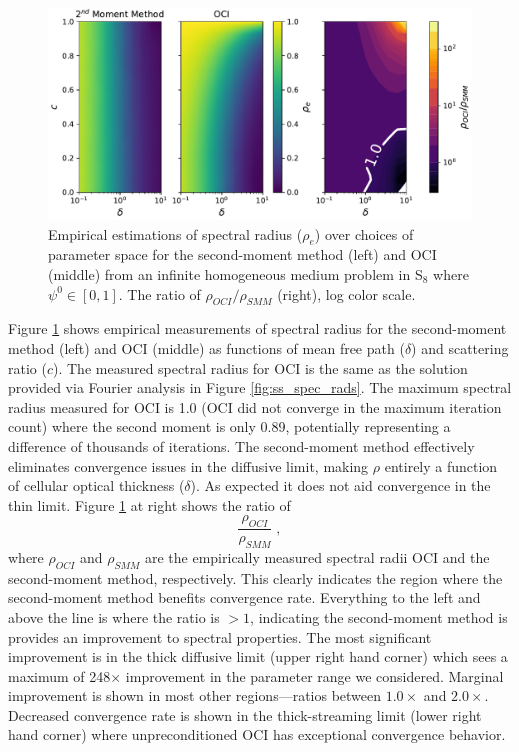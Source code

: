 \begin{figure}
    \centering
    \includegraphics[width=\linewidth]{figures/smm_paper/smm_acc.pdf}
    \caption{Empirical estimations of spectral radius ($\rho_e$) over choices of parameter space for the second-moment method (left) and OCI (middle) from an infinite homogeneous medium problem in S$_8$ where $\psi^{0} \in [0,1]$. The ratio of $\rho_{OCI} / \rho_{SMM}$ (right), log color scale.}
    \label{fig:spec_rad}
\end{figure}

Figure \ref{fig:spec_rad} shows empirical measurements of spectral radius for the second-moment method (left) and OCI (middle) as functions of mean free path ($\delta$) and scattering ratio ($c$).
The measured spectral radius for OCI is the same as the solution provided via Fourier analysis in Figure \ref{fig:ss_spec_rads}.
The maximum spectral radius measured for OCI is \num{1.0} (OCI did not converge in the maximum iteration count) where the second moment is only \num{0.89}, potentially representing a difference of thousands of iterations. The second-moment method effectively eliminates convergence issues in the diffusive limit, making $\rho$ entirely a function of cellular optical thickness ($\delta$).
As expected it does not aid convergence in the thin limit. Figure \ref{fig:spec_rad} at right shows the ratio of
\begin{equation}
    \frac{\rho_{OCI}}{\rho_{SMM}} \; ,
\end{equation}
where $\rho_{OCI}$ and $\rho_{SMM}$ are the empirically measured spectral radii OCI and the second-moment method, respectively.
This clearly indicates the region where the second-moment method benefits convergence rate.
Everything to the left and above the line is where the ratio is $ > 1$, indicating the second-moment method is provides an improvement to spectral properties.
The most significant improvement is in the thick diffusive limit (upper right hand corner) which sees a maximum of 248$\times$ improvement in the parameter range we considered.
Marginal improvement is shown in most other regions---ratios between $1.0\times$ and $2.0\times$.
Decreased convergence rate is shown in the thick-streaming limit (lower right hand corner) where unpreconditioned OCI has exceptional convergence behavior.


